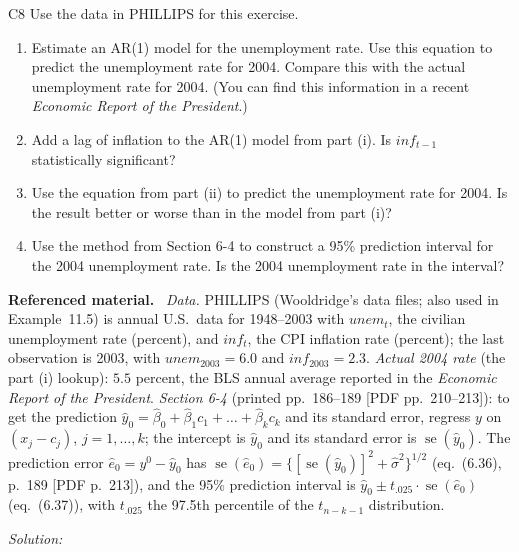 \documentclass[11pt,a4paper]{article}
\newif\ifsolucoes
\newcommand{\espacoresol}{4.5cm}   %
\numberwithin{equation}{questao}   %
\newenvironment{refmat}{\par\smallskip\noindent\small\textbf{Referenced material.}\ }{\par\smallskip}
\newcommand{\resolespaco}{\ifsolucoes\else\par\textit{Solution:}\vspace{\espacoresol}\par\fi}
\begin{document}
C8 Use the data in PHILLIPS for this exercise.
\begin{enumerate}[label=(\roman*),leftmargin=2.4em]
\item Estimate an AR(1) model for the unemployment rate. Use this equation to predict the
unemployment rate for 2004. Compare this with the actual unemployment rate for 2004. (You can find
this information in a recent \textit{Economic Report of the President}.)
\item Add a lag of inflation to the AR(1) model from part (i). Is $inf_{t-1}$ statistically
significant?
\item Use the equation from part (ii) to predict the unemployment rate for 2004. Is the result better
or worse than in the model from part (i)?
\item Use the method from Section 6-4 to construct a 95\% prediction interval for the 2004
unemployment rate. Is the 2004 unemployment rate in the interval?
\end{enumerate}
\begin{refmat}
\emph{Data.} PHILLIPS (Wooldridge's data files; also used in Example~11.5) is annual U.S.\ data for
1948--2003 with $unem_t$, the civilian unemployment rate (percent), and $inf_t$, the CPI inflation
rate (percent); the last observation is 2003, with $unem_{2003}=6.0$ and $inf_{2003}=2.3$.
\emph{Actual 2004 rate} (the part (i) lookup): $5.5$ percent, the BLS annual average reported in the
\textit{Economic Report of the President}.
\emph{Section 6-4} (printed pp.~186--189 [PDF pp.~210--213]): to get the prediction
$\hat y_0=\hat\beta_0+\hat\beta_1c_1+\dots+\hat\beta_kc_k$ and its standard error, regress $y$ on
$(x_j-c_j)$, $j=1,\dots,k$; the intercept is $\hat y_0$ and its standard error is
$\operatorname{se}(\hat y_0)$. The prediction error $\hat e_0=y^0-\hat y_0$ has
$\operatorname{se}(\hat e_0)=\{[\operatorname{se}(\hat y_0)]^2+\hat\sigma^2\}^{1/2}$ (eq.~(6.36), p.~189
[PDF p.~213]), and the 95\% prediction interval is $\hat y_0\pm t_{.025}\cdot\operatorname{se}(\hat e_0)$
(eq.~(6.37)), with $t_{.025}$ the 97.5th percentile of the $t_{n-k-1}$ distribution.
\end{refmat}
\resolespaco
\end{document}
